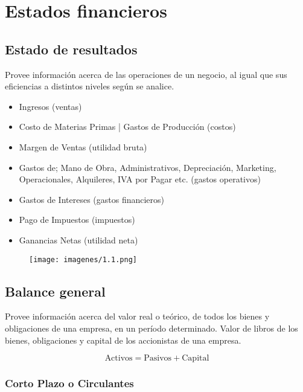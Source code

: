 






\section{Estados financieros}

\subsection{Estado de resultados}
    Provee información acerca de las operaciones de un negocio, al igual que sus 
eficiencias a distintos niveles según se analice. 

\begin{itemize}
    \item Ingresos (ventas) 
    \item Costo de Materias Primas | Gastos de Producción (costos) 
    \item Margen de Ventas (utilidad bruta) 
    \item Gastos  de;  Mano  de  Obra,  Administrativos,  Depreciación,  Marketing, 
    Operacionales, Alquileres, IVA por Pagar etc. (gastos operativos) 
    \item Gastos de Intereses (gastos financieros) 
    \item Pago de Impuestos (impuestos) 
    \item Ganancias Netas (utilidad neta)
\end{itemize}


\begin{figure}[H]
    \centering
    \texttt{[image: imagenes/1.1.png]}
\end{figure}





\subsection{Balance general}
    Provee información acerca del valor real o teórico, de todos los bienes y 
obligaciones de una empresa, en un período determinado. Valor  de  libros  de  los  bienes,  obligaciones  y  capital  de  los  accionistas  de  una 
empresa. 

$$\text{Activos} = \text{Pasivos} +\text{Capital}$$

\subsubsection{Corto Plazo o Circulantes}

